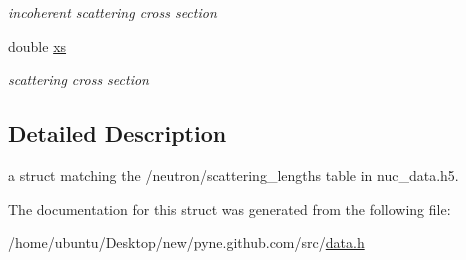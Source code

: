 \begin{DoxyCompactItemize}
\begin{DoxyCompactList}\small\item\em incoherent scattering cross section \end{DoxyCompactList}\item 
double \hyperlink{structpyne_1_1scattering__lengths_aaaab6ef13d13f4058b263f0d28da9ac3}{xs}\hypertarget{structpyne_1_1scattering__lengths_aaaab6ef13d13f4058b263f0d28da9ac3}{}\label{structpyne_1_1scattering__lengths_aaaab6ef13d13f4058b263f0d28da9ac3}

\begin{DoxyCompactList}\small\item\em scattering cross section \end{DoxyCompactList}\end{DoxyCompactItemize}


\subsection{Detailed Description}
a struct matching the \textquotesingle{}/neutron/scattering\+\_\+lengths\textquotesingle{} table in nuc\+\_\+data.\+h5. 

The documentation for this struct was generated from the following file\+:\begin{DoxyCompactItemize}
\item 
/home/ubuntu/\+Desktop/new/pyne.\+github.\+com/src/\hyperlink{data_8h}{data.\+h}\end{DoxyCompactItemize}
